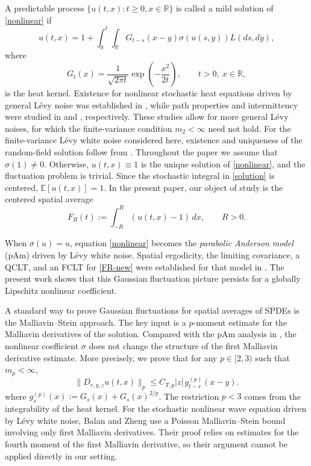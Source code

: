 \documentclass[10pt,a4paper]{amsart}
\def\bE{\mathbb{E}}
\def\bR{\mathbb{R}}
\begin{document}
\medskip


\medskip

A predictable process $\{u(t,x):t\ge0,x\in\bR\}$ is called a mild solution of
\eqref{nonlinear} if
\begin{equation}
\label{solution}
u(t,x)
=
1+
\int_0^t\int_{\bR}
G_{t-s}(x-y)\sigma(u(s,y))L(ds,dy),
\end{equation}
where
\[
G_t(x)
=
\frac{1}{\sqrt{2\pi t}}
\exp\left(-\frac{x^2}{2t}\right),
\qquad t>0,\ x\in\bR,
\]
is the heat kernel. Existence for nonlinear stochastic heat equations driven by general
L\'evy noise was established in \cite{C17}, while path properties and
intermittency were studied in \cite{CDH19} and \cite{CK19}, respectively.
 These studies allow for more general L\'evy noises, for which the
finite-variance condition $m_2<\infty$ need not hold. For the finite-variance L\'evy white noise considered here, existence
and uniqueness of the random-field solution follow from
\cite{BN17}.
Throughout the paper we assume that $\sigma(1)\neq0$.
Otherwise, $u(t,x)\equiv1$ is the unique solution of
\eqref{nonlinear}, and the fluctuation problem is trivial. Since the stochastic integral in \eqref{solution} is centered,
$\bE[u(t,x)]=1$.
In the present paper,  our object of study is the centered spatial average
\begin{equation}
\label{FR-new}
F_R(t)
:=
\int_{-R}^{R}(u(t,x)-1)\,dx,
\qquad R>0.
\end{equation}


\medskip


When $\sigma(u)=u$, equation \eqref{nonlinear} becomes the
{\em parabolic Anderson model} (pAm) driven by L\'evy white noise. Spatial ergodicity, the limiting
covariance, a QCLT, and an FCLT for \eqref{FR-new} were established for that
model in \cite{BLW26}. The present work shows that this Gaussian fluctuation
picture persists for a globally Lipschitz nonlinear coefficient.



\medskip



A standard way to prove Gaussian fluctuations for spatial averages of SPDEs is
the Malliavin--Stein approach.  The key input  is a
$p$-moment estimate for the Malliavin derivatives of the solution.
Compared with the pAm analysis in \cite{BLW26}, the nonlinear coefficient
$\sigma$ does not change the structure of the first Malliavin derivative
estimate. More precisely, we prove that for any $p\in[2,3)$ such that
$m_p<\infty$,
\begin{equation}
\label{Du}
\big\|D_{r,y,z}u(t,x)\big\|_p
\le
C_{T,p}|z|\,g_{t-r}^{(p)}(x-y).
\end{equation}
 where $g_s^{(p)}(x)
:=
G_s(x)+G_s(x)^{2/p}$. The restriction $p<3$ comes from the integrability of the heat
kernel. For the stochastic nonlinear wave equation driven by
L\'evy white noise, Balan and Zheng \cite{BZ26} use a Poisson
Malliavin--Stein bound involving only first Malliavin derivatives.
Their proof relies on estimates for the fourth moment of the
first Malliavin derivative, so their argument cannot be applied
directly in our setting.
\end{document}
